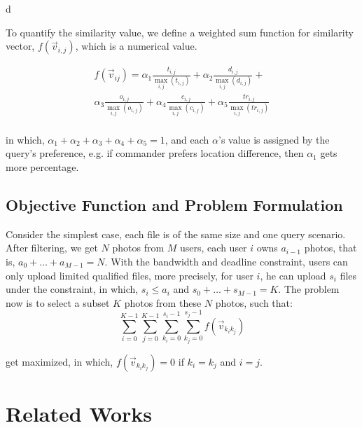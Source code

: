 d\documentclass[letterpaper]{sig-alternate-10pt}
\begin{document}
To quantify the similarity value, we define a weighted sum function for similarity vector, $f(\overrightarrow{v}_{i,j})$, which is a numerical value.

\begin{equation}
\begin{array}{l}
 f\left( {{\overrightarrow{v}_{ij}}} \right) = {\alpha _1}\frac{{{t_{i,j}}}}{{\mathop {\max }\limits_{i,j} \left( {{t_{i,j}}} \right)}} + {\alpha _2}\frac{{{d_{i,j}}}}{{\mathop {\max }\limits_{i,j} \left( {{d_{i,j}}} \right)}} +  \\
 {\alpha _3}\frac{{{o_{i,j}}}}{{\mathop {\max }\limits_{i,j} \left( {{o_{i,j}}} \right)}} + {\alpha _4}\frac{{{c_{i,j}}}}{{\mathop {\max }\limits_{i,j} \left( {{c_{i,j}}} \right)}} + {\alpha _5}\frac{{t{r_{i,j}}}}{{\mathop {\max }\limits_{i,j} \left( {t{r_{i,j}}} \right)}} \\
 \end{array}
\end{equation}

in which, $\alpha_{1}+\alpha_{2}+\alpha_{3}+\alpha_{4}+\alpha_{5}=1$, and each $\alpha$'s value is assigned by the query's preference, e.g. if commander prefers location difference, then $\alpha_{1}$ gets more percentage.

\subsection{Objective Function and Problem Formulation}

Consider the simplest case, each file is of the same size and one query scenario. After filtering, we get $N$ photos from $M$ users, each user $i$ owns $a_{i-1}$ photos, that is, $a_{0}+\ldots+a_{M-1}=N$. With the bandwidth and deadline constraint, users can only upload limited qualified files, more precisely, for user $i$, he can upload $s_{i}$ files under the constraint, in which, $s_{i}\leq a_{i}$ and $s_{0}+\ldots+s_{M-1}=K$. The problem now is to select a subset $K$ photos from these $N$ photos, such that:
\begin{equation}
\sum\limits_{i = 0}^{K - 1} {\sum\limits_{j = 0}^{K - 1} {\sum\limits_{{k_i} = 0}^{{s_i} - 1} {\sum\limits_{{k_j} = 0}^{{s_j} - 1} {f\left( {{{\vec v}_{{k_i}{k_j}}}} \right)} } } }
 \end{equation}

 get maximized, in which, $f(\overrightarrow{v}_{k_{i}k_{j}})=0$ if $k_{i}=k_{j}$ and $i=j$. 

\section{Related Works}
\end{document}

